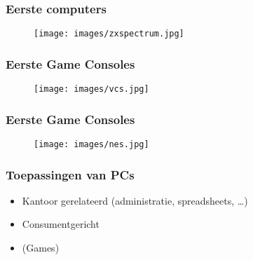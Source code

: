 \documentclass[aspectratio=43]{uva-inf-presentation}
\begin{document}

\begin{frame}
\frametitle{Eerste computers}

\begin{figure}
\texttt{[image: images/zxspectrum.jpg]}
\end{figure}

\end{frame}


\begin{frame}
\frametitle{Eerste Game Consoles}

\begin{figure}
\texttt{[image: images/vcs.jpg]}
\end{figure}

\end{frame}


\begin{frame}
\frametitle{Eerste Game Consoles}

\begin{figure}
\texttt{[image: images/nes.jpg]}
\end{figure}

\end{frame}


\begin{frame}
\frametitle{Toepassingen van PCs}

\begin{itemize}
\item Kantoor gerelateerd (administratie, spreadsheets, \dots)
\item Consumentgericht
\item (Games)
\end{itemize}

\end{frame}

\end{document}
